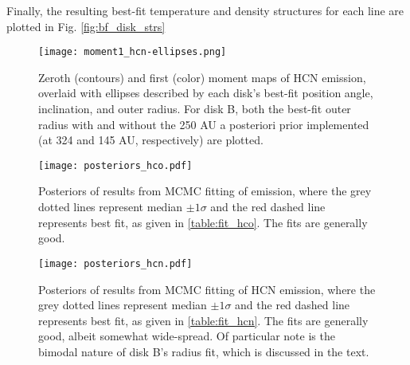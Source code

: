 Finally, the resulting best-fit temperature and density structures for each line are plotted in Fig. \ref{fig:bf_disk_strs}









\begin{figure}[htp]
  \hspace*{\fill}%
  \texttt{[image: moment1\_hcn-ellipses.png]}\hfill%
  \hspace*{\fill}%
  \caption{Zeroth (contours) and first (color) moment maps of HCN emission, overlaid with ellipses described by each disk's best-fit position angle, inclination, and outer radius. For disk B, both the best-fit outer radius with and without the 250 AU a posteriori prior implemented (at 324 and 145 AU, respectively) are plotted.}
  \label{fig:hcn_m1_ellipses}
\end{figure}




\begin{figure}%
  \hspace*{\fill}%
  \texttt{[image: posteriors\_hco.pdf]}\hfill%
  \hspace*{\fill}%
  \caption{Posteriors of results from MCMC fitting of \hco emission, where the grey dotted lines represent median $\pm 1\sigma$ and the red dashed line represents best fit, as given in \ref{table:fit_hco}. The fits are generally good.}
  \label{fig:hco_posteriors}
\end{figure}


\begin{figure}%
  \hspace*{\fill}%
  \texttt{[image: posteriors\_hcn.pdf]}\hfill%
  \hspace*{\fill}%
  \caption{Posteriors of results from MCMC fitting of HCN emission, where the grey dotted lines represent median $\pm 1\sigma$ and the red dashed line represents best fit, as given in \ref{table:fit_hcn}. The fits are generally good, albeit somewhat wide-spread. Of particular note is the bimodal nature of disk B's radius fit, which is discussed in the text.}
  \label{fig:hcn_posteriors}
\end{figure}



